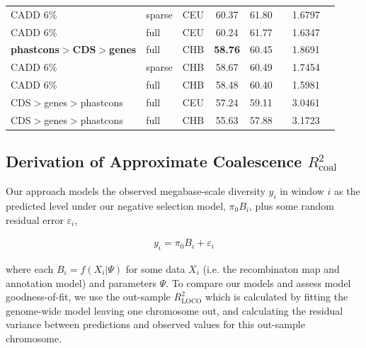\documentclass[11pt]{article}
\begin{document}
\begin{table}
\begin{tabular}{lll|crr|cc}
               CADD 6\%  &            sparse &          CEU &                        60.37 &             61.80 &             &                                 1.6797 &                                \\
               CADD 6\%  &              full &          CEU &                        60.24 &             61.77 &             &                                 1.6347 &                                \\
               \textbf{phastcons$>$CDS$>$genes}  &     full &          CHB &                        \textbf{58.76} &             60.45 &             &                                 1.8691 &                                \\
               CADD 6\%  &            sparse &          CHB &                        58.67 &             60.49 &             &                                 1.7454 &                                \\
               CADD 6\%  &              full &          CHB &                        58.48 &             60.40 &             &                                 1.5981 &                                \\
CDS$>$genes$>$phastcons  &              full &          CEU &                        57.24 &             59.11 &             &                                 3.0461 &                                \\
CDS$>$genes$>$phastcons  &              full &          CHB &                        55.63 &             57.88 &             &                                 3.1723 &                                \\
\end{tabular}
\end{table}


\subsection{Derivation of Approximate Coalescence $R_\text{coal}^2$}
\label{supp:r2-coal}

Our approach models the observed megabase-scale diversity $y_i$ in window $i$
as the predicted level under our negative selection model, $\pi_0 B_i$, plus
some random residual error $\varepsilon_i$,

\begin{align}
    y_i = \pi_0 B_i + \varepsilon_i
\end{align}

where each $B_i = f(X_i | \Psi)$ for some data $X_i$ (i.e. the recombinaton map
and annotation model) and parameters $\Psi$. To compare our models and assess
model goodness-of-fit, we use the out-sample $R_\text{LOCO}^2$ which is
calculated by fitting the genome-wide model leaving one chromosome out, and
calculating the residual variance between predictions and observed values for
this out-sample chromosome. 
\end{document}
